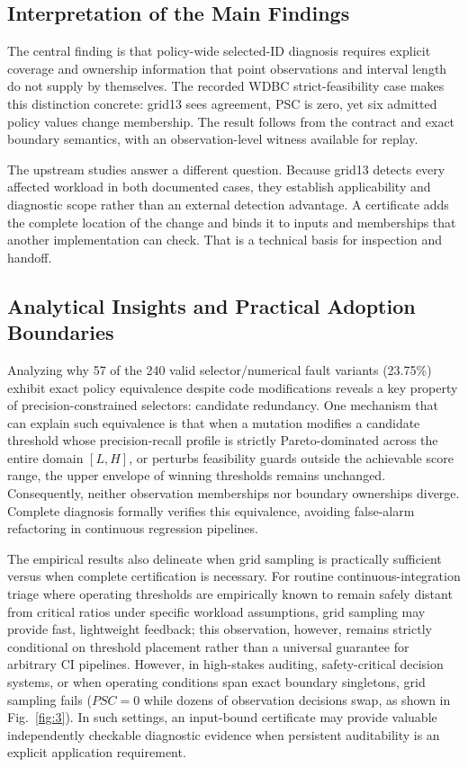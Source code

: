 \documentclass[11pt,a4paper]{article}
\begin{document}
\subsection{Interpretation of the Main Findings}

The central finding is that policy-wide selected-ID diagnosis requires explicit coverage and ownership information that point observations and interval length do not supply by themselves. The recorded WDBC strict-feasibility case makes this distinction concrete: grid13 sees agreement, PSC is zero, yet six admitted policy values change membership. The result follows from the contract and exact boundary semantics, with an observation-level witness available for replay.

The upstream studies answer a different question. Because grid13 detects every affected workload in both documented cases, they establish applicability and diagnostic scope rather than an external detection advantage. A certificate adds the complete location of the change and binds it to inputs and memberships that another implementation can check. That is a technical basis for inspection and handoff.


\subsection{Analytical Insights and Practical Adoption Boundaries}\label{subsec:discussion_insights}

Analyzing why 57 of the 240 valid selector/numerical fault variants (23.75\%) exhibit exact policy equivalence despite code modifications reveals a key property of precision-constrained selectors: candidate redundancy. One mechanism that can explain such equivalence is that when a mutation modifies a candidate threshold whose precision-recall profile is strictly Pareto-dominated across the entire domain $[L, H]$, or perturbs feasibility guards outside the achievable score range, the upper envelope of winning thresholds remains unchanged. Consequently, neither observation memberships nor boundary ownerships diverge. Complete diagnosis formally verifies this equivalence, avoiding false-alarm refactoring in continuous regression pipelines.

The empirical results also delineate when grid sampling is practically sufficient versus when complete certification is necessary. For routine continuous-integration triage where operating thresholds are empirically known to remain safely distant from critical ratios under specific workload assumptions, grid sampling may provide fast, lightweight feedback; this observation, however, remains strictly conditional on threshold placement rather than a universal guarantee for arbitrary CI pipelines. However, in high-stakes auditing, safety-critical decision systems, or when operating conditions span exact boundary singletons, grid sampling fails ($PSC=0$ while dozens of observation decisions swap, as shown in Fig.~\ref{fig:3}). In such settings, an input-bound certificate may provide valuable independently checkable diagnostic evidence when persistent auditability is an explicit application requirement.
\end{document}
